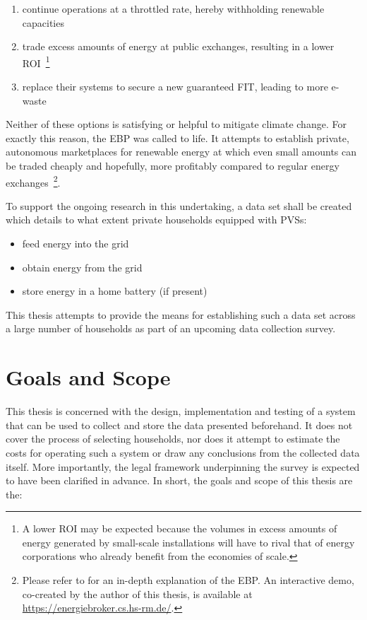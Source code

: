 \begin{enumerate}[label=(\Alph*)]
  \item continue operations at a throttled rate, hereby withholding renewable capacities
  \item trade excess amounts of energy at public exchanges, resulting in a lower \acs{ROI}~\footnote{A lower \acs{ROI} may be expected because the volumes in excess amounts of energy generated by small-scale installations will have to rival that of energy corporations who already benefit from the economies of scale.}
  \item replace their systems to secure a new guaranteed \ac{FIT}, leading to more e-waste
\end{enumerate}

Neither of these options is satisfying or helpful to mitigate climate change. For exactly this reason, the \ac{EBP} was called to life. It attempts to establish private, autonomous marketplaces for renewable energy at which even small amounts can be traded cheaply and hopefully, more profitably compared to regular energy exchanges~\footnote{Please refer to \cite{stoy2019broker} for an in-depth explanation of the \ac{EBP}. An interactive demo, co-created by the author of this thesis, is available at \url{https://energiebroker.cs.hs-rm.de/}.}.

To support the ongoing research in this undertaking, a data set shall be created which details to what extent private households equipped with \acsp{PVS}:

\begin{itemize}
  \item feed energy into the grid
  \item obtain energy from the grid
  \item store energy in a home battery (if present)
\end{itemize}

This thesis attempts to provide the means for establishing such a data set across a large number of households as part of an upcoming data collection survey.


\section{Goals and Scope}
\label{sec:goals-and-scope}

This thesis is concerned with the design, implementation and testing of a system that can be used to collect and store the data presented beforehand. It does not cover the process of selecting households, nor does it attempt to estimate the costs for operating such a system or draw any conclusions from the collected data itself. More importantly, the legal framework underpinning the survey is expected to have been clarified in advance. In short, the goals and scope of this thesis are the:

